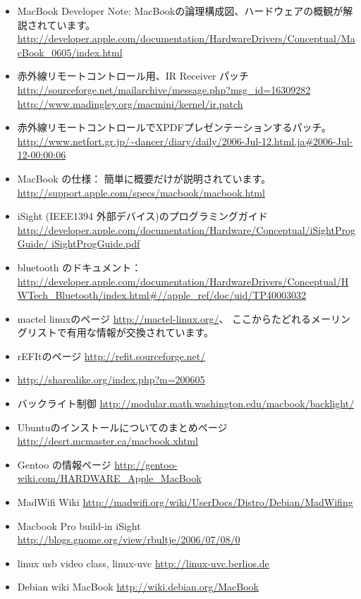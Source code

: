 \documentclass[mingoth,a4paper]{jsarticle}
\begin{document}
\begin{itemize}
 \item MacBook Developer Note: MacBookの論理構成図、ハードウェアの概観が解説されています。
       \url{http://developer.apple.com/documentation/HardwareDrivers/Conceptual/MacBook_0605/index.html}
 \item 赤外線リモートコントロール用、IR Receiver パッチ
       \url{http://sourceforge.net/mailarchive/message.php?msg_id=16309282}
       \url{http://www.madingley.org/macmini/kernel/ir.patch}
 \item 赤外線リモートコントロールでXPDFプレゼンテーションするパッチ。
       \url{http://www.netfort.gr.jp/~dancer/diary/daily/2006-Jul-12.html.ja#2006-Jul-12-00:00:06}
 \item MacBook の仕様： 簡単に概要だけが説明されています。
       \url{http://support.apple.com/specs/macbook/macbook.html}
 \item iSight (IEEE1394 外部デバイス)のプログラミングガイド
       \url{http://developer.apple.com/documentation/Hardware/Conceptual/iSightProgGuide/
iSightProgGuide.pdf}
 \item bluetooth のドキュメント： \url{http://developer.apple.com/documentation/HardwareDrivers/Conceptual/HWTech_Bluetooth/index.html#//apple_ref/doc/uid/TP40003032}
 \item mactel linuxのページ \url{http://mactel-linux.org/}、
       ここからたどれるメーリングリストで有用な情報が交換されています。
 \item rEFItのページ \url{http://refit.sourceforge.net/}
 \item \url{http://sharealike.org/index.php?m=200605}
 \item バックライト制御
       \url{http://modular.math.washington.edu/macbook/backlight/}
 \item Ubuntuのインストールについてのまとめページ
       \url{http://desrt.mcmaster.ca/macbook.xhtml}
 \item Gentoo の情報ページ
       \url{http://gentoo-wiki.com/HARDWARE_Apple_MacBook}
 \item MadWifi Wiki
       \url{http://madwifi.org/wiki/UserDocs/Distro/Debian/MadWifing}
 \item Macbook Pro build-in iSight
       \url{http://blogs.gnome.org/view/rbultje/2006/07/08/0}
 \item linux usb video class, linux-uvc
       \url{http://linux-uvc.berlios.de}
 \item Debian wiki MacBook \url{http://wiki.debian.org/MacBook}
\end{itemize}
\end{document}
